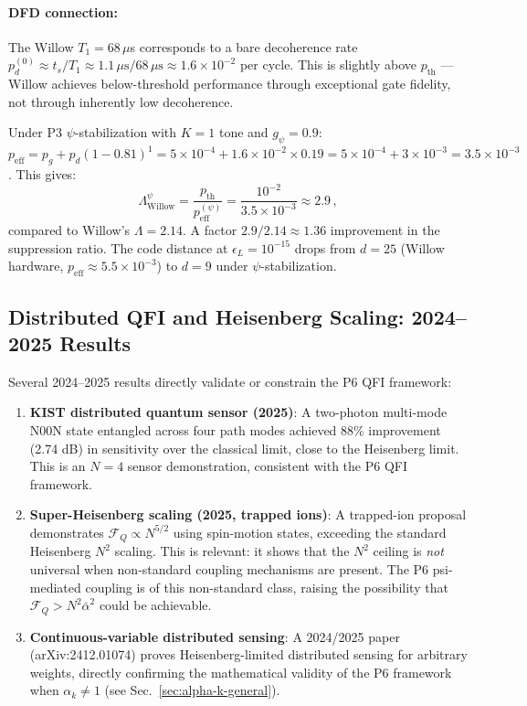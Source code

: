 \documentclass[11pt]{article}
\theoremstyle{definition}
\theoremstyle{remark}
\begin{document}
\paragraph{DFD connection:} The Willow $T_1 = 68\,\mu$s corresponds to a bare
decoherence rate $p_d^{(0)} \approx t_s/T_1 \approx 1.1\,\mu\mathrm{s}/68\,\mu\mathrm{s}
\approx 1.6\times 10^{-2}$ per cycle. This is slightly above $p_{\mathrm{th}}$
--- Willow achieves below-threshold performance through exceptional gate fidelity,
not through inherently low decoherence.

Under P3 $\psi$-stabilization with $K = 1$ tone and $g_\psi = 0.9$:
$p_{\mathrm{eff}} = p_g + p_d(1-0.81)^1 = 5\times 10^{-4} + 1.6\times 10^{-2}
\times 0.19 = 5\times 10^{-4} + 3\times 10^{-3} = 3.5\times 10^{-3}$.
This gives:
\begin{equation}
\Lambda^{\psi}_{\mathrm{Willow}} = \frac{p_{\mathrm{th}}}{p_{\mathrm{eff}}^{(\psi)}}
= \frac{10^{-2}}{3.5\times 10^{-3}} \approx 2.9\,,
\end{equation}
compared to Willow's $\Lambda = 2.14$. A factor $2.9/2.14 \approx 1.36$
improvement in the suppression ratio. The code distance at $\epsilon_L =
10^{-15}$ drops from $d = 25$ (Willow hardware, $p_{\mathrm{eff}} \approx 5.5\times
10^{-3}$) to $d = 9$ under $\psi$-stabilization.

\subsection{Distributed QFI and Heisenberg Scaling: 2024--2025 Results}

Several 2024--2025 results directly validate or constrain the P6 QFI framework:

\begin{enumerate}
\item \textbf{KIST distributed quantum sensor (2025)}: A two-photon multi-mode
N00N state entangled across four path modes achieved 88\% improvement (2.74 dB)
in sensitivity over the classical limit, close to the Heisenberg limit. This
is an $N = 4$ sensor demonstration, consistent with the P6 QFI framework.

\item \textbf{Super-Heisenberg scaling (2025, trapped ions)}: A trapped-ion
proposal demonstrates $\mathcal{F}_Q \propto N^{5/2}$ using spin-motion states,
exceeding the standard Heisenberg $N^2$ scaling. This is relevant: it shows that
the $N^2$ ceiling is \emph{not} universal when non-standard coupling mechanisms
are present. The P6 psi-mediated coupling is of this non-standard class, raising
the possibility that $\mathcal{F}_Q > N^2\bar\alpha^2$ could be achievable.

\item \textbf{Continuous-variable distributed sensing}: A 2024/2025 paper
(arXiv:2412.01074) proves Heisenberg-limited distributed sensing for arbitrary
weights, directly confirming the mathematical validity of the P6 framework when
$\alpha_k \neq 1$ (see Sec.~\ref{sec:alpha-k-general}).
\end{enumerate}
\end{document}
